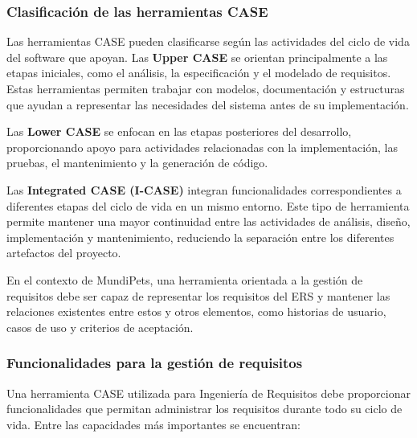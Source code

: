 \documentclass[journal,onecolumn]{IEEEtran}
\begin{document}
	\subsubsection{Clasificación de las herramientas CASE}
	
	Las herramientas CASE pueden clasificarse según las actividades del ciclo de vida del software que
	apoyan. Las \textbf{Upper CASE} se orientan principalmente a las etapas iniciales, como el
	análisis, la especificación y el modelado de requisitos. Estas herramientas permiten trabajar con
	modelos, documentación y estructuras que ayudan a representar las necesidades del sistema antes de
	su implementación.
	
	Las \textbf{Lower CASE} se enfocan en las etapas posteriores del desarrollo, proporcionando apoyo
	para actividades relacionadas con la implementación, las pruebas, el mantenimiento y la generación
	de código.
	
	Las \textbf{Integrated CASE (I-CASE)} integran funcionalidades correspondientes a diferentes
	etapas del ciclo de vida en un mismo entorno. Este tipo de herramienta permite mantener una mayor
	continuidad entre las actividades de análisis, diseño, implementación y mantenimiento, reduciendo
	la separación entre los diferentes artefactos del proyecto.
	
	En el contexto de MundiPets, una herramienta orientada a la gestión de requisitos debe ser capaz de
	representar los requisitos del ERS y mantener las relaciones existentes entre estos y otros
	elementos, como historias de usuario, casos de uso y criterios de aceptación.
	
	\subsubsection{Funcionalidades para la gestión de requisitos}
	
	Una herramienta CASE utilizada para Ingeniería de Requisitos debe proporcionar funcionalidades que
	permitan administrar los requisitos durante todo su ciclo de vida. Entre las capacidades más
	importantes se encuentran:
	
\end{document}
